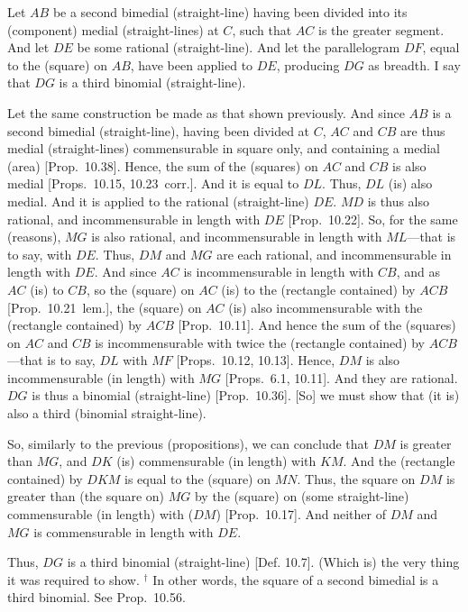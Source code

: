 Let $AB$ be a second bimedial (straight-line) having been divided into its (component)
medial (straight-lines) at $C$, such that $AC$ is the greater segment. And
let $DE$ be some rational (straight-line). And let the parallelogram
$DF$, equal to the (square) on $AB$, have been applied to $DE$,
producing $DG$ as breadth. I say that $DG$ is a third binomial (straight-line).

Let the same construction  be made as that shown previously. And since $AB$ is a second bimedial (straight-line), having been divided at $C$, $AC$ and
$CB$ are thus medial (straight-lines) commensurable in square only,
and containing a medial (area) [Prop.~10.38]. Hence, the sum  of the (squares) on
$AC$ and $CB$ is also medial [Props.~10.15, 10.23~corr.]. And it is equal to $DL$. Thus, $DL$ (is)
also medial. And it is applied to the rational (straight-line) $DE$. $MD$
is thus also rational, and incommensurable in length with $DE$
[Prop.~10.22]. So, for the same (reasons),
$MG$ is also rational, and incommensurable in length with $ML$---that is to say, with $DE$. Thus, $DM$ and $MG$ are each rational, and incommensurable in length with $DE$. And since	$AC$ is incommensurable
in length with $CB$, and as $AC$ (is) to $CB$, so the (square)
on $AC$ (is) to the (rectangle contained) by $ACB$ [Prop.~10.21~lem.], the (square) on $AC$
(is) also incommensurable with the (rectangle contained) by $ACB$
[Prop.~10.11]. And hence the sum of the
(squares) on $AC$ and $CB$ is incommensurable with twice the (rectangle
contained) by $ACB$---that is to say, $DL$ with $MF$ [Props.~10.12, 10.13].  Hence,
$DM$ is also incommensurable (in length) with $MG$ [Props.~6.1, 10.11].
And they are rational.  $DG$ is thus a binomial (straight-line)
[Prop.~10.36]. [So]
we must show that (it is) also a third (binomial straight-line).

So, similarly to the previous (propositions), we can conclude that
$DM$ is greater than $MG$, and $DK$ (is) commensurable (in length) 
with $KM$.  And the (rectangle contained) by $DKM$ is equal to the
(square) on $MN$. Thus, the square on $DM$ is greater than (the square on)
$MG$ by the (square) on (some straight-line) commensurable (in length) with ($DM$)
[Prop.~10.17]. And neither of $DM$ and $MG$
is commensurable in length with $DE$.

Thus, $DG$ is a third binomial (straight-line) [Def. 10.7]. (Which is) the very thing it
was required to show.
{\footnotesize\noindent$^\dag$ In other words, the square of a second bimedial  is a
third binomial. See Prop.~10.56.}

